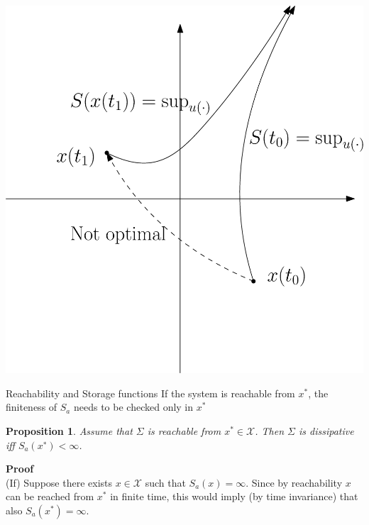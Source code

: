 \documentclass[aspectratio=169]{beamer}
\newtheorem{proposition}{Proposition}
\begin{document}
\begin{frame}
\centering
\includegraphics[width=.6\textwidth]{proof1.eps}
\end{frame}

\begin{frame}{Reachability and Storage functions}
If the system is reachable from $x^*$, the finiteness of $S_a$ needs to be checked only in $x^*$
\begin{proposition}
	Assume that $\Sigma$ is reachable from $x^* \in \mathcal{X}$. Then $\Sigma$ is dissipative
	iff $S_a (x^∗) < \infty$.
\end{proposition}

\textbf{Proof} \\
(If) Suppose there exists $x \in \mathcal{X}$ such that $S_a(x) = \infty$. Since
by reachability $x$  can be reached from $x^*$ in finite time, this would imply (by time
invariance) that also $S_a(x^*) = \infty$.


\end{frame}
\end{document}
